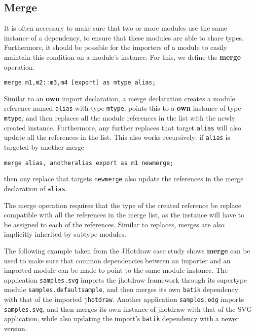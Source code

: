 

\subsection{Merge}

It is often necessary to make sure that two or more modules use the same
instance of a dependency, to ensure that these
modules are able to share types. Furthermore, it should be possible for
the importers of a module to easily maintain this condition on a module's
instance. For this, we define the \textbf{merge} operation.

\begin{lstlisting}
merge m1,m2::m3,m4 [export] as mtype alias;
\end{lstlisting}

Similar to an \textbf{own} import declaration, a merge declaration creates
a module reference named \texttt{alias} with type \texttt{mtype},
points this to a \textbf{own} instance of type \texttt{mtype}, and then replaces all
the module references in the list with the newly created instance. Furthermore,
any further replaces that target \texttt{alias} will also update all
the references in the list. This also works recursively: if \texttt{alias}
is targeted by another merge 
\begin{lstlisting}
merge alias, anotheralias export as m1 newmerge;
\end{lstlisting}
then any replace that targets \texttt{newmerge} also update the references
in the merge declaration of \texttt{alias}.

The merge operation requires that the type of the created reference be replace
compatible with all the references in the merge list, as the instance will
have to be assigned to each of the references. Similar to replaces, merges 
are also implicitly inherited by subtype modules.

The following example taken from the JHotdraw case study shows \textbf{merge}
can be used to make sure that common dependencies between an importer and
an imported module can be made to point to the same module instance. The
application \texttt{samples.svg} imports the jhotdraw framework through
its supertype module \texttt{samples.defaultsample}, and then merges
its own \texttt{batik} dependency with that of the imported \texttt{jhotdraw}.
Another application \texttt{samples.odg} imports \texttt{samples.svg}, 
and then merges its own instance of jhotdraw with that of the SVG application, 
while also updating the import's \texttt{batik} dependency with a newer version.


